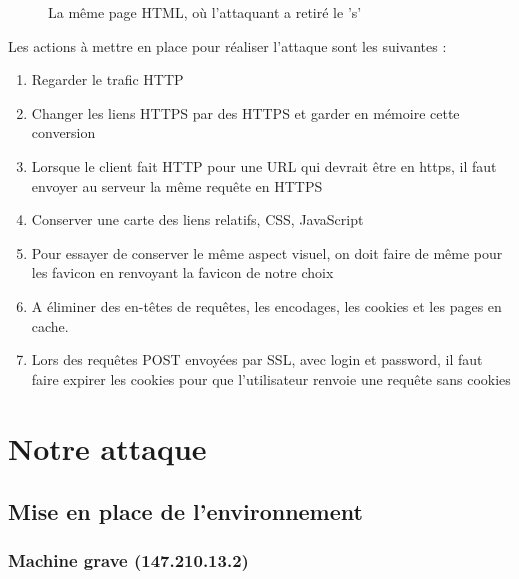 \begin{figure}[H]
  \caption{La même page HTML, où l'attaquant a retiré le 's'}
\end{figure}

Les actions à mettre en place pour réaliser l'attaque sont les suivantes :

\begin{enumerate}
\item Regarder le trafic HTTP
\item Changer les liens HTTPS par des HTTPS et garder en mémoire cette conversion
\item Lorsque le client fait HTTP pour une URL qui devrait être en https, il faut envoyer au serveur la même requête en HTTPS
\item Conserver une carte des liens relatifs, CSS, JavaScript
\item Pour essayer de conserver le même aspect visuel, on doit faire de même pour les favicon en renvoyant la favicon de notre choix
\item A éliminer des en-têtes de requêtes, les encodages, les cookies et les pages en cache.
\item Lors des requêtes POST envoyées par SSL, avec login et password, il faut faire expirer les cookies pour que l'utilisateur renvoie une requête sans cookies
\end{enumerate}

\section{Notre attaque}

\subsection{Mise en place de l'environnement}

\subsubsection{Machine grave (147.210.13.2)}

